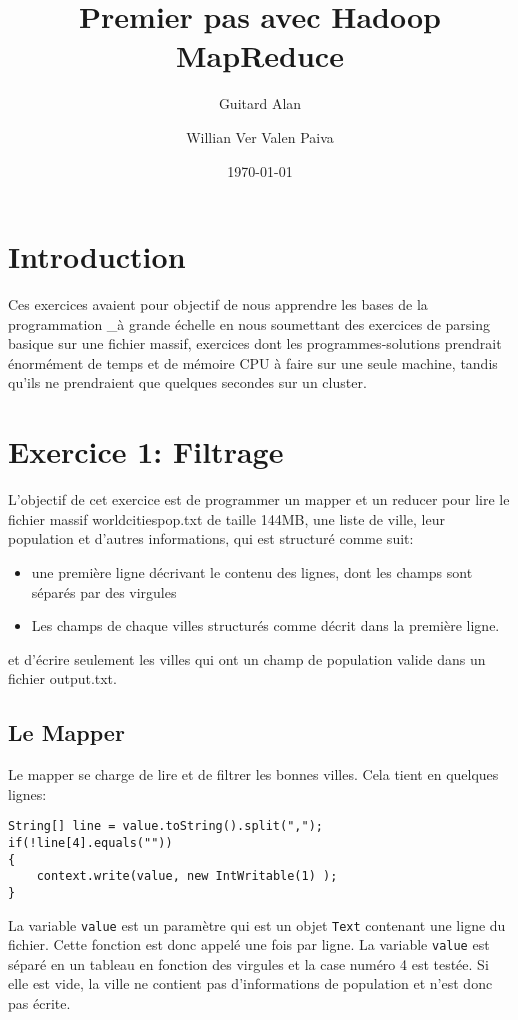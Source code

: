 \documentclass[a4paper]{article}
\author{Guitard Alan \and Willian Ver Valen Paiva }
\date{\today}
\title{Premier pas avec Hadoop MapReduce}
\begin{document}
\maketitle

\tableofcontents

\newpage

\section{Introduction}
	
Ces exercices avaient pour objectif de nous apprendre les bases de la programmation \_à grande échelle en nous soumettant des exercices
de parsing basique sur une fichier massif, exercices dont les programmes-solutions prendrait énormément de temps et de mémoire CPU 
à faire sur une seule machine, tandis qu'ils ne prendraient que quelques secondes sur un cluster. 

\section{Exercice 1: Filtrage}

L'objectif de cet exercice est de programmer un mapper et un reducer pour lire le fichier massif worldcitiespop.txt de taille 144MB, une liste de ville, leur population et d'autres informations, qui est structuré comme suit:
\begin{itemize}
\item une première ligne décrivant le contenu des lignes, dont les champs sont séparés par des virgules
\item Les champs de chaque villes structurés comme décrit dans la première ligne.
\end{itemize}

et d'écrire seulement les villes qui ont un champ de population valide dans un fichier output.txt. 

\subsection{Le Mapper}
Le mapper se charge de lire et de filtrer les bonnes villes. Cela tient en quelques lignes:
\begin{lstlisting}
String[] line = value.toString().split(",");
if(!line[4].equals(""))
{
    context.write(value, new IntWritable(1) );
}
\end{lstlisting}

La variable \verb?value? est un paramètre qui est un objet \verb?Text? contenant une ligne du fichier. Cette fonction est donc appelé une fois par ligne. La variable \verb?value? est séparé en un tableau en fonction des virgules et la case numéro 4 est testée. Si elle est vide, la ville ne contient pas d'informations de population et n'est donc pas écrite. 
\end{document}
